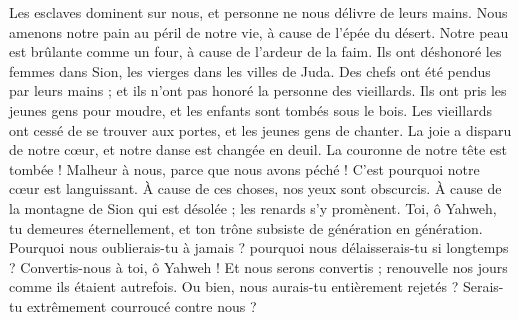 \begin{multicols}{2}
Les esclaves dominent sur nous, et personne ne nous délivre de leurs mains.
Nous amenons notre pain au péril de notre vie, à cause de l'épée du désert.
Notre peau est brûlante comme un four, à cause de l'ardeur de la faim.
Ils ont déshonoré les femmes dans Sion, les vierges dans les villes de Juda.
Des chefs ont été pendus par leurs mains ; et ils n'ont pas honoré la personne des vieillards.
Ils ont pris les jeunes gens pour moudre, et les enfants sont tombés sous le bois.
Les vieillards ont cessé de se trouver aux portes, et les jeunes gens de chanter.
La joie a disparu de notre cœur, et notre danse est changée en deuil.
La couronne de notre tête est tombée ! Malheur à nous, parce que nous avons péché !
C'est pourquoi notre cœur est languissant. À cause de ces choses, nos yeux sont obscurcis.
À cause de la montagne de Sion qui est désolée ; les renards s'y promènent.
Toi, ô Yahweh, tu demeures éternellement, et ton trône subsiste de génération en génération.
Pourquoi nous oublierais-tu à jamais ? pourquoi nous délaisserais-tu si longtemps ?
Convertis-nous à toi, ô Yahweh ! Et nous serons convertis ; renouvelle nos jours comme ils étaient autrefois.
Ou bien, nous aurais-tu entièrement rejetés ? Serais-tu extrêmement courroucé contre nous ?
\PPE{}
\end{multicols}
